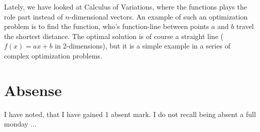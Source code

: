 \documentclass[10pt,oneside,a4paper,final,english]{memoir}
\begin{document}
Lately, we have looked at Calculus of Variations, where the functions
plays the role part instead of $n$-dimensional vectors. An example of
such an optimization problem is to find the function, who's
function-line between points $a$ and $b$ travel the shortest
distance. The optimal solution is of course a straight line ($f(x) =
ax+b$ in 2-dimensions), but it is a simple example in a series of
complex optimization problems.



\section{Absense}
I have noted, that I have gained 1 absent mark. I do not recall being
absent a full monday $\ldots$
\end{document}
